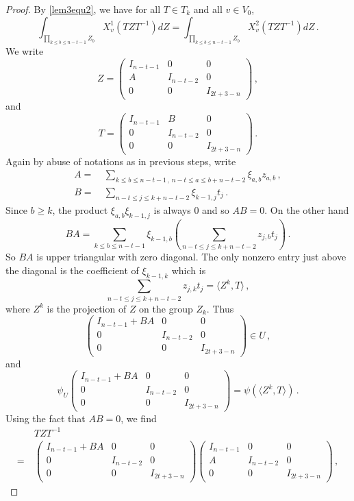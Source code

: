 \documentclass[12pt]{amsart}
\begin{document}
\begin{proof}
By \eqref{lem3equ2}, we have for all $T\in T_k$ and all $v \in V_0$, 
\[ \int_{\prod_{k \leq b \leq n-t-1} Z_b} X_v^1 ( T Z T^{-1}) d Z = \int_{\prod_{k \leq b \leq n-t-1} Z_b} X_v^2 (TZT^{-1}) d Z\,.\]
We write
\[ Z = \left(\begin{array}{ccc} I_{n-t-1} & 0 & 0 \\ A & I_{n-t-2} & 0 \\0 &0 & I_{2t + 3 -n} \end{array}\right)\,,\]
and
\[ T= \left(\begin{array}{ccc} I_{n-t-1} & B & 0 \\ 0 & I_{n-t-2} & 0 \\0 &0 & I_{2t + 3 -n} \end{array}\right)\,. \]
Again by abuse of notations as in previous steps, write
\begin{align*}
A=\ & \sum_{k \leq b\leq n-t-1\,,\, n-t \leq a \leq b+ n-t-2} \xi_{a,b} z_{a,b} \,,\\
B=\ & \sum_{n-t\leq j\leq k+n-t-2} \xi_{k-1, j} t _j \,.
\end{align*}
Since $b\geq k$, the product $ \xi_{a,b} \xi_{k-1, j}$ is always $0$ and so $AB=0$. On the other hand
\[ BA= \sum_{ k \leq b\leq n-t-1} \xi_{k-1, b} \left( \sum _{ n-t\leq j\leq k+n-t-2}z_{j,b} t_j \right)\,.\] 
So $BA$ is upper triangular with zero diagonal. The only nonzero entry just above the diagonal is the coefficient of $\xi_{k-1,k}$ which is 
$$\sum _{ n-t\leq j\leq k+n-t-2}z_{j,k} t_j = \langle Z^k, T\rangle\,,$$
where $Z^k$ is the projection of $Z$ on the group $Z_k$. 
Thus
\[  \left(\begin{array}{ccc} I_{n-t-1}+BA  & 0 & 0 \\ 0 & I_{n-t-2} & 0 \\0 &0 & I_{2t + 3 -n} \end{array}\right)\in U\,, \]
and
\[ \psi_U\left(\begin{array}{ccc} I_{n-t-1}+BA  & 0 & 0 \\ 0 & I_{n-t-2} & 0 \\0 &0 & I_{2t + 3 -n} \end{array}\right) = \psi( \langle Z^k, T\rangle) \,.\]
Using the fact that $AB=0$, we find
\begin{align*}
\ & TZT^{-1}\\
 =\ & \left(\begin{array}{ccc} I_{n-t-1}+BA  & 0 & 0 \\ 0 & I_{n-t-2} & 0 \\0 &0 & I_{2t + 3 -n} \end{array}\right)\left(\begin{array}{ccc} I_{n-t-1} & 0 & 0 \\ A & I_{n-t-2} & 0 \\0 &0 & I_{2t + 3 -n} \end{array}\right)\,,

\end{align*}
\end{proof}
\end{document}
